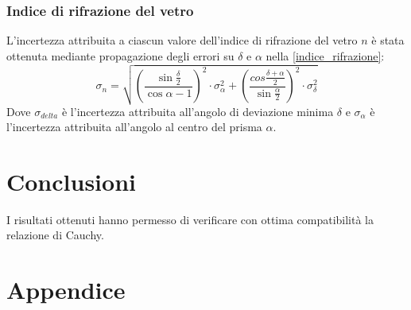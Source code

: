 \documentclass[]{article}
\let\oldsection\section%
\renewcommand{\section}{%
	\renewcommand{\theequation}{\thesection.\arabic{equation}}%
	\oldsection}%
\begin{document}
    \subsubsection{Indice di rifrazione del vetro}
    L'incertezza attribuita a ciascun valore dell'indice di rifrazione del vetro $n$ è stata ottenuta mediante propagazione degli errori su $\delta$ e $\alpha$ nella \ref{indice_rifrazione}:
    \begin{equation}
        \label{sigma-n}
        \sigma_n = \sqrt{ \left(\frac{\sin{\frac{\delta}{2}}}{\cos{\alpha}-1}\right)^2 \cdot \sigma_{\alpha}^2 + \left(\frac{cos{\frac{\delta + \alpha}{2}}}{\sin{\frac{\alpha}{2}}}\right)^2 \cdot \sigma_{\delta}^2   }
    \end{equation}
    Dove $\sigma_{delta}$ è l'incertezza attribuita all'angolo di deviazione minima $\delta$ e $\sigma_{\alpha}$ è l'incertezza attribuita all'angolo al centro del prisma $\alpha$.

    \section{Conclusioni}
    I risultati ottenuti hanno permesso di verificare con ottima compatibilità la relazione di Cauchy.

    \newpage

    \section*{Appendice}
\end{document}
